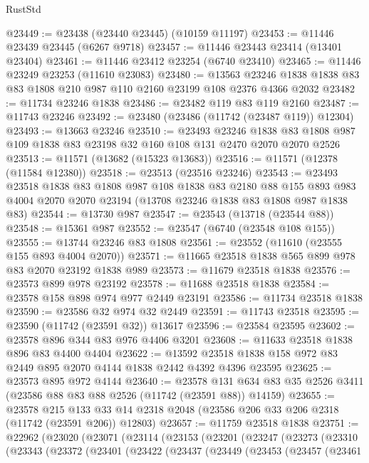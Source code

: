 \begin{lexlean}{RustStd}
\begin{coremodule}
@23449 := @23438 (@23440 @23445) (@10159 @11197)
@23453 := @11446 @23439 @23445 (@6267 @9718)
@23457 := @11446 @23443 @23414 (@13401 @23404)
@23461 := @11446 @23412 @23254 (@6740 @23410)
@23465 := @11446 @23249 @23253 (@11610 @23083)
@23480 := @13563 @23246 @1838 @1838 @83 @83 @1808 @210 @987 @110 @2160 @23199 @108 @2376 @4366 @2032
@23482 := @11734 @23246 @1838
@23486 := @23482 @119 @83 @119 @2160
@23487 := @11743 @23246
@23492 := @23480 (@23486 (@11742 (@23487 @119)) @12304)
@23493 := @13663 @23246
@23510 := @23493
    @23246
    @1838
    @83
    @1808
    @987
    @109
    @1838
    @83
    @23198
    @32
    @160
    @108
    @131
    @2470
    @2070
    @2070
    @2526
@23513 := @11571 (@13682 (@15323 @13683))
@23516 := @11571 (@12378 (@11584 @12380))
@23518 := @23513 (@23516 @23246)
@23543 := @23493
    @23518
    @1838
    @83
    @1808
    @987
    @108
    @1838
    @83
    @2180
    @88
    @155
    @893
    @983
    @4004
    @2070
    @2070
    @23194
    (@13708 @23246 @1838 @83 @1808 @987 @1838 @83)
@23544 := @13730 @987
@23547 := @23543 (@13718 (@23544 @88))
@23548 := @15361 @987
@23552 := @23547 (@6740 (@23548 @108 @155))
@23555 := @13744 @23246 @83 @1808
@23561 := @23552 (@11610 (@23555 @155 @893 @4004 @2070))
@23571 := @11665 @23518 @1838 @565 @899 @978 @83 @2070 @23192 @1838 @989
@23573 := @11679 @23518 @1838
@23576 := @23573 @899 @978 @23192
@23578 := @11688 @23518 @1838
@23584 := @23578 @158 @898 @974 @977 @2449 @23191
@23586 := @11734 @23518 @1838
@23590 := @23586 @32 @974 @32 @2449
@23591 := @11743 @23518
@23595 := @23590 (@11742 (@23591 @32)) @13617
@23596 := @23584 @23595
@23602 := @23578 @896 @344 @83 @976 @4406 @3201
@23608 := @11633 @23518 @1838 @896 @83 @4400 @4404
@23622 := @13592 @23518 @1838 @158 @972 @83 @2449 @895 @2070 @4144 @1838 @2442 @4392 @4396 @23595
@23625 := @23573 @895 @972 @4144
@23640 := @23578
    @131
    @634
    @83
    @35
    @2526
    @3411
    (@23586 @88 @83 @88 @2526 (@11742 (@23591 @88)) @14159)
@23655 := @23578
    @215
    @133
    @33
    @14
    @2318
    @2048
    (@23586 @206 @33 @206 @2318 (@11742 (@23591 @206)) @12803)
@23657 := @11759 @23518 @1838
@23751 := @22962
    (@23020
      (@23071
        (@23114
          (@23153
            (@23201
              (@23247
                (@23273
                  (@23310
                    (@23343
                      (@23372
                        (@23401
                          (@23422
                            (@23437
                              (@23449
                                (@23453
                                  (@23457
                                    (@23461

\end{coremodule}
\end{lexlean}
